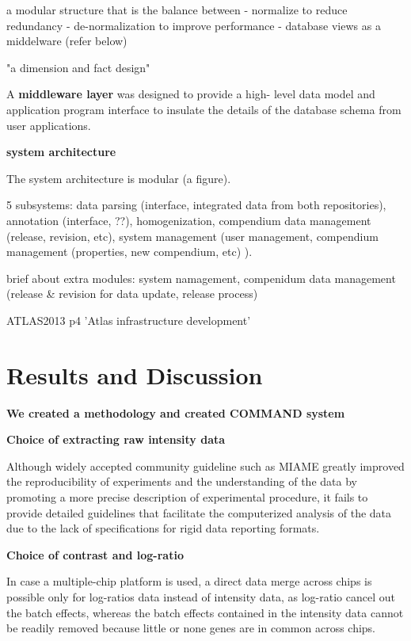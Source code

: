 a modular structure that is the balance between 
- normalize to reduce redundancy
- de-normalization to improve performance
- database views as a middelware (refer below)

"a dimension and fact design"

A \textbf{middleware layer} was designed to provide a high-
level data model and application program interface to
insulate the details of the database schema from user
applications. 


\textbf{system architecture}

The system architecture is modular (a figure). 

5 subsystems: data parsing (interface, integrated data from both
repositories), annotation (interface, ??), homogenization, compendium data management
(release, revision, etc), system management (user management,
compendium management (properties, new compendium, etc) ).

brief about extra modules: system namagement, compenidum data management 
(release \& revision for data update,  release process)


\cite{Petryszak2013} ATLAS2013 p4  'Atlas infrastructure development'




\section{Results and Discussion}

\textbf{We created a methodology and created COMMAND system}

\textbf{Choice of extracting raw intensity data}


Although widely accepted community guideline such as MIAME \cite{Brazma2001}
greatly improved the reproducibility of experiments and the understanding of
the data by promoting a more precise description of experimental procedure, it
fails to provide detailed guidelines that facilitate the computerized analysis
of the data due to the lack of specifications for rigid data reporting formats.


\textbf{Choice of contrast and log-ratio}

In case a multiple-chip platform is used, a direct data merge across
chips is possible only for log-ratios data instead of intensity data,
as log-ratio cancel out the batch effects, whereas the batch effects
contained in the intensity data cannot be readily removed because
little or none genes are in common across chips.


